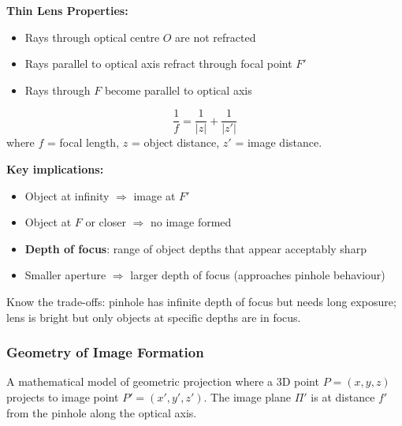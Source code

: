 \separator

\textbf{Thin Lens Properties:}
\begin{itemize}
  \item Rays through optical centre $O$ are not refracted
  \item Rays parallel to optical axis refract through focal point $F'$
  \item Rays through $F$ become parallel to optical axis
\end{itemize}

\begin{thmbox}
\[
\frac{1}{f} = \frac{1}{|z|} + \frac{1}{|z'|}
\]
where $f$ = focal length, $z$ = object distance, $z'$ = image distance.
\end{thmbox}

\textbf{Key implications:}
\begin{itemize}
  \item Object at infinity $\Rightarrow$ image at $F'$
  \item Object at $F$ or closer $\Rightarrow$ no image formed
  \item \textbf{Depth of focus}: range of object depths that appear acceptably sharp
  \item Smaller aperture $\Rightarrow$ larger depth of focus (approaches pinhole behaviour)
\end{itemize}

\begin{tipbox}
Know the trade-offs: pinhole has infinite depth of focus but needs long exposure; lens is bright but only objects at specific depths are in focus.
\end{tipbox}

\bigseparator

\subsubsection{Geometry of Image Formation}

\begin{defbox}
A mathematical model of geometric projection where a 3D point $P = (x,y,z)$ projects to image point $P' = (x',y',z')$. The image plane $\Pi'$ is at distance $f'$ from the pinhole along the optical axis.
\end{defbox}

\separator

